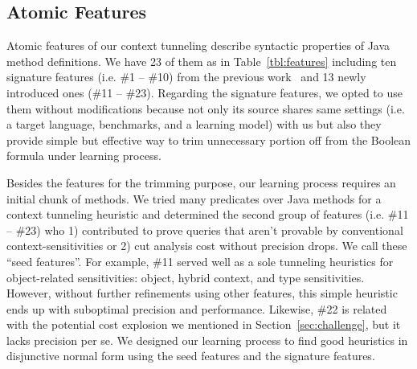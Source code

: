 \newpage
\subsection{Atomic Features}\label{sec:features}
Atomic features of our context tunneling describe syntactic properties of Java method definitions. We have 23 of them as in Table~\ref{tbl:features} including ten signature features (i.e. \#1 -- \#10) from the previous work~\cite{JeJeChOh17} and 13 newly introduced ones (\#11 -- \#23). Regarding the signature features, we opted to use them without modifications because not only its source shares same settings (i.e. a target language, benchmarks, and a learning model) with us but also they provide simple but effective way to trim unnecessary portion off from the Boolean formula under learning process.

Besides the features for the trimming purpose, our learning process requires an initial chunk of methods. We tried many predicates over Java methods for a context tunneling heuristic and determined the second group of features (i.e. \#11 -- \#23) who 1) contributed to prove queries that aren't provable by conventional context-sensitivities or 2) cut analysis cost without precision drops. We call these ``seed features''. For example, \#11 served well as a sole tunneling heuristics for object-related sensitivities: object, hybrid context, and type sensitivities. However, without further refinements using other features, this simple heuristic ends up with suboptimal precision and performance. Likewise, \#22 is related with the potential cost explosion we mentioned in Section~\ref{sec:challenge}, but it lacks precision per se. We designed our learning process to find good heuristics in disjunctive normal form using the seed features and the signature features.

